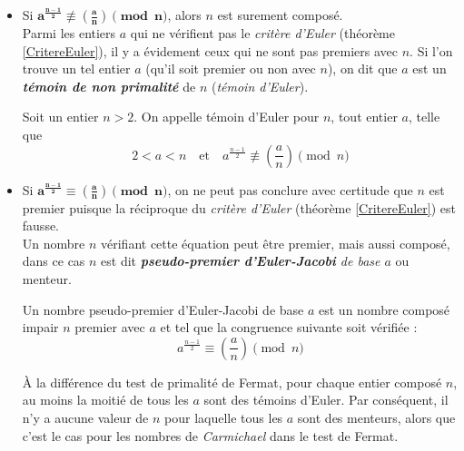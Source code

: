 		\begin{itemize}
		\item Si $\mathbf{a^{\frac{n-1}{2}} \not\equiv \left ( \frac{a}{n} \right ) \pmod n}$, alors $n$ est surement composé.\\
		Parmi les entiers $a$ qui ne vérifient pas le \textit{critère d'Euler} (théorème \ref{CritereEuler}), il y a évidement ceux qui ne sont pas premiers avec $n$. Si l'on trouve un tel entier $a$ (qu'il soit premier ou non avec $n$), on dit que $a$ est un \textit{\textbf{témoin de non primalité}} de $n$ (\textit{témoin d'Euler}).
			
			\vspace{-1.5em}\begin{adjustwidth}{1.5cm}{1.5cm} 
			\begin{Def}
			\label{TemEuler}
				Soit un entier $n > 2$. On appelle témoin d'Euler pour $n$, tout entier $a$, telle que
				\[2 < a < n  \quad \text{et} \quad a^{\frac{n-1}{2}} \not\equiv \left ( \frac{a}{n} \right ) \pmod n\]
			\end{Def}
			\end{adjustwidth}\vspace{0.5em}
		
		\item Si $\mathbf{a^{\frac{n-1}{2}} \equiv \left ( \frac{a}{n} \right ) \pmod n}$, on ne peut pas conclure avec certitude que $n$ est premier puisque la réciproque du \textit{critère d'Euler} (théorème \ref{CritereEuler}) est fausse.\\
		Un nombre $n$ vérifiant cette équation peut être premier, mais aussi composé, dans ce cas $n$ est dit \textit{\textbf{pseudo-premier d'Euler-Jacobi} de base $a$} ou menteur.
					
			\vspace{-1.5em}\begin{adjustwidth}{1.5cm}{1.5cm} 
			\begin{Def}
				\label{PseudoPremEulerJ}
				Un nombre pseudo-premier d'Euler-Jacobi de base $a$ est un nombre composé impair $n$ premier avec $a$ et tel que la congruence suivante soit vérifiée :
				\[a^{\frac{n-1}{2}} \equiv \left ( \frac{a}{n} \right ) \pmod n\]
			\end{Def}
			\end{adjustwidth}\vspace{0.5em}
			
		À la différence du test de primalité de Fermat, pour chaque entier composé $n$, au moins la moitié de tous les $a$ sont des témoins d’Euler. Par conséquent, il n’y a aucune valeur de $n$ pour laquelle tous les $a$ sont des menteurs, alors que c'est le cas pour les nombres de \textit{Carmichael} dans le test de Fermat.
		\end{itemize}
	
